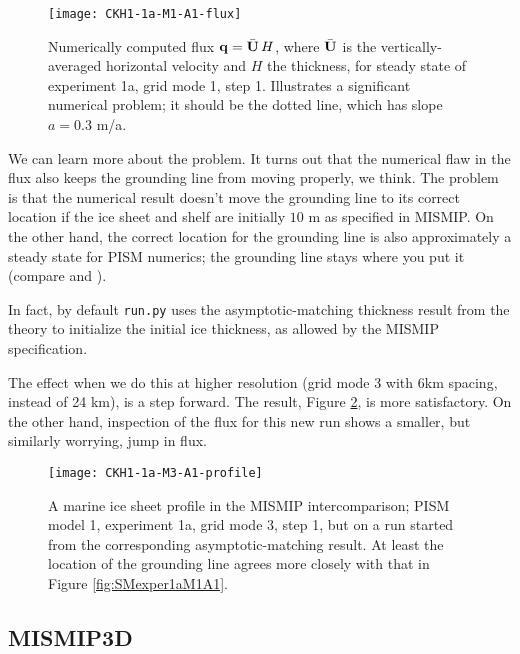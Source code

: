 \begin{figure}[ht]
\centering
\texttt{[image: CKH1-1a-M1-A1-flux]}
\caption{Numerically computed flux $\mathbf{q} = \bar{\mathbf{U}}\, H$, where $\bar{\mathbf{U}}$ is the vertically-averaged horizontal velocity and $H$ the thickness, for steady state of experiment 1a, grid mode 1, step 1.  Illustrates a significant numerical problem; it should be the dotted line, which has slope $a = 0.3$ m/a.}
\label{fig:cflx1aM1A1}
\end{figure}

We can learn more about the problem.  It turns out that the numerical flaw in the flux also keeps the grounding line from moving properly, we think.  The problem is that the numerical result doesn't move the grounding line to its correct location if the ice sheet and shelf are initially $10$ m as specified in MISMIP.  On the other hand, the correct location for the grounding line is also approximately a steady state for PISM numerics; the grounding line stays where you put it (compare \cite{SchoofMarine2} and \cite{VieliPayne}).

In fact, by default \texttt{run.py} uses the asymptotic-matching thickness result from the \cite{SchoofMarine1} theory to initialize the initial ice thickness, as allowed by the MISMIP specification.

The effect when we do this at higher resolution (grid mode 3 with 6km spacing, instead of 24 km), is a step forward.
The result, Figure \ref{fig:MISMIPmodel1exper1aM3A1FROMSM}, is more satisfactory.  On the other hand, inspection of the flux for this new run shows a smaller, but similarly worrying, jump in flux.

\begin{figure}[ht]
\centering
\texttt{[image: CKH1-1a-M3-A1-profile]}
\caption{A marine ice sheet profile in the MISMIP intercomparison; PISM model 1, experiment 1a, grid mode 3, step 1, but on a run started from the corresponding asymptotic-matching result.  At least the location of the grounding line agrees more closely with that in Figure \ref{fig:SMexper1aM1A1}.}
\label{fig:MISMIPmodel1exper1aM3A1FROMSM}
\end{figure}



\subsection{MISMIP3D}\label{subsect:MISMIP3D}

